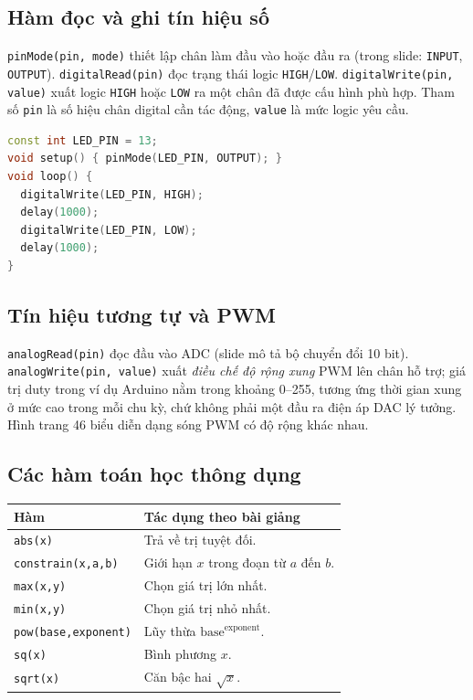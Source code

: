 \subsection{Hàm đọc và ghi tín hiệu số}
\texttt{pinMode(pin, mode)} thiết lập chân làm đầu vào hoặc đầu ra (trong slide: \texttt{INPUT}, \texttt{OUTPUT}). \texttt{digitalRead(pin)} đọc trạng thái logic \texttt{HIGH}/\texttt{LOW}. \texttt{digitalWrite(pin, value)} xuất logic \texttt{HIGH} hoặc \texttt{LOW} ra một chân đã được cấu hình phù hợp. Tham số \texttt{pin} là số hiệu chân digital cần tác động, \texttt{value} là mức logic yêu cầu.
\begin{lstlisting}[language=C++]
const int LED_PIN = 13;
void setup() { pinMode(LED_PIN, OUTPUT); }
void loop() {
  digitalWrite(LED_PIN, HIGH);
  delay(1000);
  digitalWrite(LED_PIN, LOW);
  delay(1000);
}
\end{lstlisting}
\subsection{Tín hiệu tương tự và PWM}
\texttt{analogRead(pin)} đọc đầu vào ADC (slide mô tả bộ chuyển đổi 10 bit). \texttt{analogWrite(pin, value)} xuất \emph{điều chế độ rộng xung} PWM lên chân hỗ trợ; giá trị duty trong ví dụ Arduino nằm trong khoảng 0--255, tương ứng thời gian xung ở mức cao trong mỗi chu kỳ, chứ không phải một đầu ra điện áp DAC lý tưởng. Hình trang 46 biểu diễn dạng sóng PWM có độ rộng khác nhau.
\subsection{Các hàm toán học thông dụng}
\begin{longtable}{p{.26\linewidth}p{.64\linewidth}}\toprule\textbf{Hàm} & \textbf{Tác dụng theo bài giảng}\\\midrule\endhead
\texttt{abs(x)} & Trả về trị tuyệt đối.\\
\texttt{constrain(x,a,b)} & Giới hạn \(x\) trong đoạn từ \(a\) đến \(b\).\\
\texttt{max(x,y)} & Chọn giá trị lớn nhất.\\
\texttt{min(x,y)} & Chọn giá trị nhỏ nhất.\\
\texttt{pow(base,exponent)} & Lũy thừa \(\mathrm{base}^{\mathrm{exponent}}\).\\
\texttt{sq(x)} & Bình phương \(x\).\\
\texttt{sqrt(x)} & Căn bậc hai \(\sqrt{x}\).\\\bottomrule\end{longtable}
